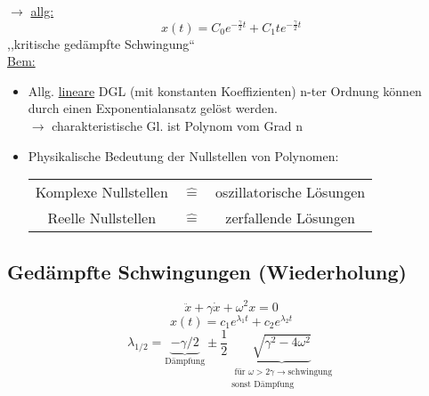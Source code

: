 \documentclass[titlepage,12pt,a4paper,ngerman]{report}
\newcommand{\tx}[1]{\textrm{#1}}
\newcommand{\ub}[1]{\underbrace{#1}}
\begin{document}
{$\rightarrow$ \underline{allg:} 
$$x(t) = C_0  e ^{-\frac{\gamma}{2}t} + C_1 t  e ^{-\frac{\gamma}{2}t}$$
,,kritische gedämpfte Schwingung``\\
\underline{Bem:}
\begin{itemize}
	\item Allg. \underline{lineare} DGL (mit konstanten Koeffizienten) n-ter Ordnung können durch einen Exponentialansatz gelöst werden.\\
	$\rightarrow$ charakteristische Gl. ist Polynom vom Grad n
	\item Physikalische Bedeutung der Nullstellen von Polynomen:\\
	\begin{tabular}{ccc}
		Komplexe Nullstellen & $\widehat{=}$ & oszillatorische Lösungen \\
		Reelle Nullstellen & $\widehat{=}$ & zerfallende Lösungen
	\end{tabular}
\end{itemize}

\subsection*{Gedämpfte Schwingungen (Wiederholung)}
$$\ddot{x} + \gamma \dot{x} + \omega^2 x = 0$$
$$ x(t) = c_1 e^{\lambda_1 t} + c_2 e^{\lambda_2 t}$$
$$\lambda_{1/2} = \ub{- \gamma/2}_{\tx{Dämpfung}} \pm \frac{1}{2} \underbrace{\sqrt{\gamma^2 - 4 \omega^2}}_{\substack{\textrm{ für } \omega > 2 \gamma \rightarrow \textrm{schwingung} \\ \textrm{sonst Dämpfung}}}$$ 

}
\end{document}
